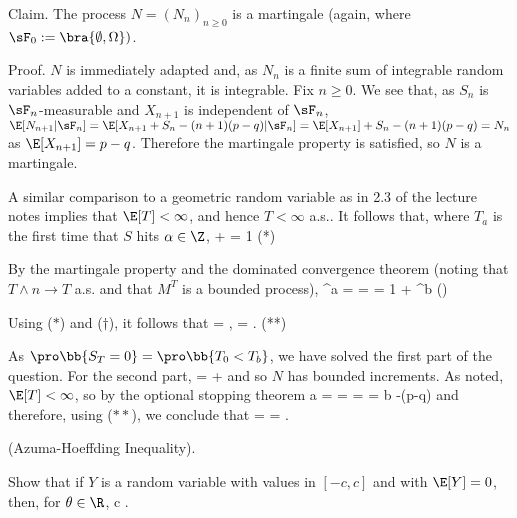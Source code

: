 Claim. The process $N = (N_n)_{n\geq 0}$ is a martingale (again, where $\sF_0 := \bra{\emptyset,\Omega})$.

Proof. $N$ is immediately adapted and, as $N_n$ is a finite sum of integrable random variables added to a constant, it is integrable. Fix $n \geq 0$. We see that, as $S_n$ is $\sF_n$-measurable and $X_{n+1}$ is independent of $\sF_n$, $\E[N_{n+1}|\sF_n] = \E[X_{n+1}+S_n-(n+1)(p-q)|\sF_n] = \E[X_{n+1}]+S_n-(n+ 1)(p-q) = N_n$ as $\E[X_{n+1}] = p-q$. Therefore the martingale property is satisfied, so $N$ is a martingale.

A similar comparison to a geometric random variable as in 2.3 of the lecture notes implies that $\E[T] < \infty$, and hence $T < \infty$ a.s.. It follows that, where $T_a$ is the first time that $S$ hits $\alpha \in \Z$,
\be
\pro{} + \pro{} = 1 \qquad (*)
\ee

By the martingale property and the dominated convergence theorem (noting that $T \land n \to T$ a.s. and that $M^T$ is a bounded process),
\be
{}^a = \E[M^T_0] = \E[M^T_n]  \E[M_T] = 1 \cdot \pro{} + ^b \pro{} \qquad (\dag)
\ee

Using ($*$) and ($\dag$), it follows that
\be
\pro{}  = ,\qquad \pro{} = . \qquad (**)
\ee

As $\pro\bb{S_T = 0} = \pro\bb{T_0 < T_b}$, we have solved the first part of the question. For the second part,
\be
{} =  \leq {} +  
\ee
and so $N$ has bounded increments. As noted, $\E[T] < \infty$, so by the optional stopping theorem
\be
a = \E[N_0] = \E[N_T ] = \E[S_T -T(p-q)] = b\pro{} -\E[T](p-q)
\ee
and therefore, using ($**$), we conclude that
\be
\E[T] =  = .
\ee

\vspace{2mm}

\qcutline


\item (Azuma-Hoeffding Inequality).
\ben
\item [(a)] Show that if $Y$ is a random variable with values in $[-c, c]$ and with $\E[Y ] = 0$, then, for $\theta \in\R$,
\be
\E[e^{\theta Y} ] \leq \cosh \theta c \leq \exp{}.
\ee

